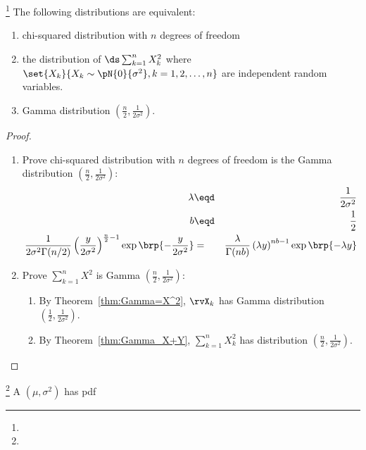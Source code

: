 \begin{theorem}
\footnote{
  }
The following distributions are equivalent:
\begin{enumerate}
  \item chi-squared distribution with $n$ degrees of freedom
  \item the distribution of $\ds \sum_{k=1}^n X_k^2$ where
        $\set{X_k}{X_k\sim\pN{0}{\sigma^2}, k=1,2,\ldots,n}$
        are independent random variables.
  \item Gamma distribution $\left(\frac{n}{2}, \frac{1}{2\sigma^2} \right)$.
\end{enumerate}
\end{theorem}
\begin{proof}
\begin{enumerate}
\item Prove chi-squared distribution with $n$ degrees of freedom is the
      Gamma distribution $\left(\frac{n}{2}, \frac{1}{2\sigma^2} \right)$:
  \begin{eqnarray*}
    \lambda &\eqd& \frac{1}{2\sigma^2} \\
    b       &\eqd& \frac{1}{2} \\
    \frac{1}{2\sigma^2\Gamma(n/2)}
                 \left(\frac{y}{2\sigma^2}\right)^{\frac{n}{2}-1}
                 \exp\brp{-\frac{y}{2\sigma^2}}
      &=& \frac{\lambda}{\Gamma(nb)}
          \left(\lambda y \right)^{nb-1}
          \exp\brp{-\lambda y}
  \end{eqnarray*}

\item Prove $\sum_{k=1}^n X^2$ is Gamma $\left(\frac{n}{2}, \frac{1}{2\sigma^2} \right)$:
  \begin{enumerate}
    \item By Theorem~\ref{thm:Gamma=X^2}, $\rvX_k$ has Gamma distribution
          $\left(\frac{1}{2}, \frac{1}{2\sigma^2} \right)$.
    \item By Theorem~\ref{thm:Gamma_X+Y}, $\sum_{k=1}^n X_k^2$ has
          distribution $\left(\frac{n}{2}, \frac{1}{2\sigma^2} \right)$.
  \end{enumerate}
\end{enumerate}
\end{proof}

\begin{definition}
\footnote{
  }
A  $(\mu,\sigma^2)$
has pdf
\end{definition}

